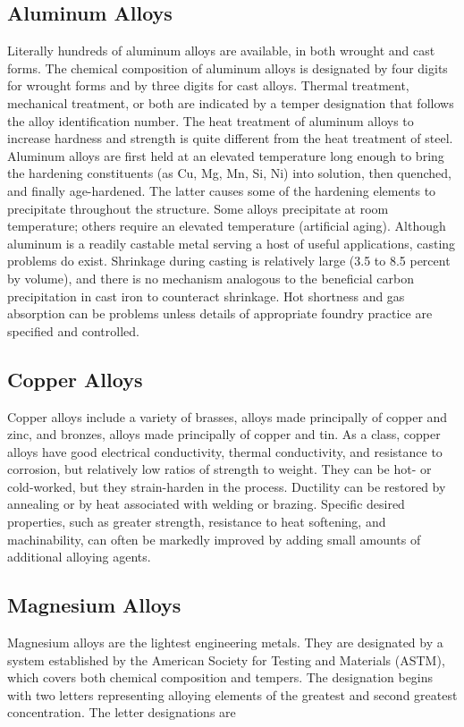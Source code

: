 \documentclass[a4paper,openany,12pt]{book}
\begin{document}
\subsection{Aluminum Alloys}
\label{aluminum-alloys}
Literally hundreds of aluminum alloys are available, in both wrought and
cast forms. The chemical composition of aluminum alloys is designated by
four digits for wrought forms and by three digits for cast alloys.
Thermal treatment, mechanical treatment, or both are indicated by a
temper designation that follows the alloy identification number. The
heat treatment of aluminum alloys to increase hardness and strength is
quite different from the heat treatment of steel. Aluminum alloys are
first held at an elevated temperature long enough to bring the hardening
constituents (as Cu, Mg, Mn, Si, Ni) into solution, then quenched, and
finally age-hardened. The latter causes some of the hardening elements
to precipitate throughout the structure. Some alloys precipitate at room
temperature; others require an elevated temperature (artificial aging).
Although aluminum is a readily castable metal serving a host of useful
applications, casting problems do exist. Shrinkage during casting is
relatively large (3.5 to 8.5 percent by volume), and there is no
mechanism analogous to the beneficial carbon precipitation in cast iron
to counteract shrinkage. Hot shortness and gas absorption can be
problems unless details of appropriate foundry practice are specified
and controlled.

\subsection{Copper Alloys}
\label{copper-alloys}
Copper alloys include a variety of brasses, alloys made principally of
copper and zinc, and bronzes, alloys made principally of copper and tin.
As a class, copper alloys have good electrical conductivity, thermal
conductivity, and resistance to corrosion, but relatively low ratios of
strength to weight. They can be hot- or cold-worked, but they
strain-harden in the process. Ductility can be restored by annealing or
by heat associated with welding or brazing. Specific desired properties,
such as greater strength, resistance to heat softening, and
machinability, can often be markedly improved by adding small amounts of
additional alloying agents.

\subsection{Magnesium Alloys}
\label{magnesium-alloys}
Magnesium alloys are the lightest engineering metals. They are
designated by a system established by the American Society for Testing
and Materials (ASTM), which covers both chemical composition and
tempers. The designation begins with two letters representing alloying
elements of the greatest and second greatest concentration. The letter
designations are
\end{document}
